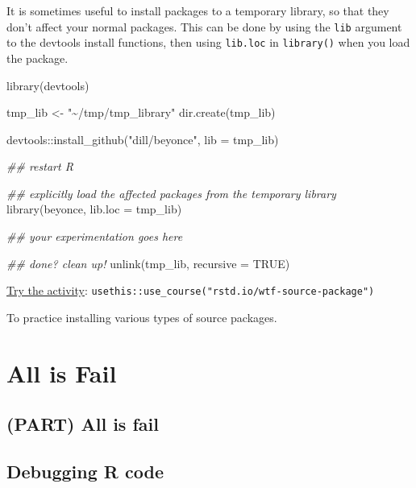 \documentclass[
  letterpaper,
]{book}
\newenvironment{Shaded}{\begin{snugshade}}{\end{snugshade}}
\newcommand{\AttributeTok}[1]{\textcolor[rgb]{0.40,0.45,0.13}{#1}}
\newcommand{\ConstantTok}[1]{\textcolor[rgb]{0.56,0.35,0.01}{#1}}
\newcommand{\DocumentationTok}[1]{\textcolor[rgb]{0.37,0.37,0.37}{\textit{#1}}}
\newcommand{\FunctionTok}[1]{\textcolor[rgb]{0.28,0.35,0.67}{#1}}
\newcommand{\NormalTok}[1]{\textcolor[rgb]{0.00,0.23,0.31}{#1}}
\newcommand{\OtherTok}[1]{\textcolor[rgb]{0.00,0.23,0.31}{#1}}
\newcommand{\SpecialCharTok}[1]{\textcolor[rgb]{0.37,0.37,0.37}{#1}}
\newcommand{\StringTok}[1]{\textcolor[rgb]{0.13,0.47,0.30}{#1}}
\begin{document}
It is sometimes useful to install packages to a temporary library, so
that they don't affect your normal packages. This can be done by using
the \texttt{lib} argument to the devtools install functions, then using
\texttt{lib.loc} in \texttt{library()} when you load the package.

\begin{Shaded}
\begin{Highlighting}[]
\FunctionTok{library}\NormalTok{(devtools)}

\NormalTok{tmp\_lib }\OtherTok{\textless{}{-}} \StringTok{"\textasciitilde{}/tmp/tmp\_library"}
\FunctionTok{dir.create}\NormalTok{(tmp\_lib)}

\NormalTok{devtools}\SpecialCharTok{::}\FunctionTok{install\_github}\NormalTok{(}\StringTok{"dill/beyonce"}\NormalTok{, }\AttributeTok{lib =}\NormalTok{ tmp\_lib)}

\DocumentationTok{\#\# restart R}

\DocumentationTok{\#\# explicitly load the affected packages from the temporary library}
\FunctionTok{library}\NormalTok{(beyonce, }\AttributeTok{lib.loc =}\NormalTok{ tmp\_lib)}

\DocumentationTok{\#\# your experimentation goes here}

\DocumentationTok{\#\# done? clean up!}
\FunctionTok{unlink}\NormalTok{(tmp\_lib, }\AttributeTok{recursive =} \ConstantTok{TRUE}\NormalTok{)}
\end{Highlighting}
\end{Shaded}

\begin{rmdinfo}
\href{https://raw.githubusercontent.com/jimhester/wtf-source-package/master/01_source-package_spartan.R}{Try
the activity}:
\texttt{usethis::use\_course("rstd.io/wtf-source-package")}

To practice installing various types of source packages.
\end{rmdinfo}

\part{All is Fail}

\hypertarget{part-all-is-fail}{%
\chapter*{(PART) All is fail}\label{part-all-is-fail}}

\hypertarget{debugging-r-code}{%
\chapter*{Debugging R code}\label{debugging-r-code}}
\end{document}
